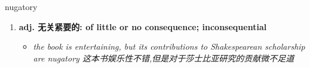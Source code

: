 
\begin{frame}
{\huge nugatory}
\begin{center}
\begin{enumerate}\Large
  \item \textbf{adj. 无关紧要的: of little or no consequence; inconsequential}
  \begin{itemize}
    \item \em{\Large{the book is entertaining, but its contributions to Shakespearean scholarship are nugatory 这本书娱乐性不错,但是对于莎士比亚研究的贡献微不足道}}
  \end{itemize}
\end{enumerate}
\end{center}
\end{frame}
